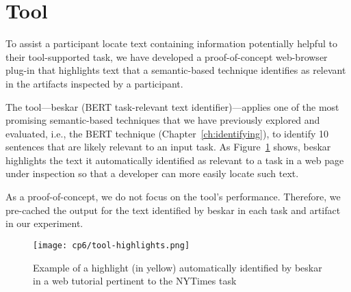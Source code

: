 \section{Tool}
\label{cp6:tool}


To assist a participant locate text containing information potentially helpful to their tool-supported task, we have developed a proof-of-concept web-browser plug-in 
that highlights text that a semantic-based technique 
identifies as relevant in the artifacts inspected by a participant.



The tool---\acs{beskar} (BERT task-relevant text identifier)---applies 
one of the most promising semantic-based techniques that we have previously explored and evaluated,
i.e., the BERT technique (Chapter~\ref{ch:identifying}),
to identify 10 sentences that are likely relevant to an input task. 
As Figure~\ref{fig:tool-output} shows,
\acs{beskar} highlights the text it automatically identified as relevant 
to a task in a web page under inspection
so that a developer can more easily locate such text.


As a proof-of-concept, we do not focus on the tool's performance.
Therefore, we pre-cached the output 
for the text identified by \acs{beskar} in each task and artifact 
in our experiment. 




\begin{figure}
    \centering
    \texttt{[image: cp6/tool-highlights.png]}
    \caption{Example of a highlight (in yellow) automatically identified by \acs{beskar}
    in a web tutorial pertinent to the NYTimes task}
    \label{fig:tool-output}
\end{figure}

